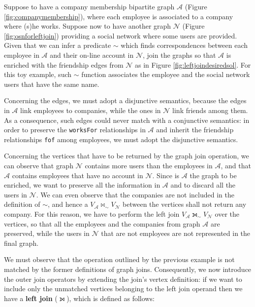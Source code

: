 \begin{example}
	Suppose to have a company membership bipartite graph $\mathcal{A}$ (Figure \ref{fig:companymembership}), where each employee is associated to a company where (s)he works. Suppose now to have another graph $\mathcal{N}$ (Figure \ref{fig:osnforleftjoin}) providing a social network where some users are provided. Given that we can infer a predicate $\sim$ which finds correspondences between each employee in $\mathcal{A}$ and their on-line account in $\mathcal{N}$, join the graphs so that $\mathcal{A}$ is enriched with the friendship edges from $\mathcal{N}$ as in Figure \ref{fig:leftjoindesiredsol}. For this toy example, such $\sim$ function associates the employee and the social network users that have the same name.
	\medskip
	

	Concerning the edges, we must adopt a disjunctive semantics, because the edges in $\mathcal{A}$ link employees to companies, while the ones in $\mathcal{N}$ link friends among them. As a consequence, such edges could never match with a conjunctive semantics: in order to preserve the \texttt{worksFor} relationships in $\mathcal{A}$ and inherit the friendship relationships \texttt{fof} among employees, we must adopt the disjunctive semantics.
	
	Concerning the vertices that have to be returned by the graph join operation, we can observe that graph $\mathcal{N}$ contains more users than the employees in $\mathcal{A}$, and that $\mathcal{A}$ contains employees that have no account in $\mathcal{N}$. Since is $\mathcal{A}$ the graph to be enriched, we want to preserve all the information in $\mathcal{A}$ and to discard all the users in $\mathcal{N}$. We can even observe that the companies are not included in the definition of $\sim$, and hence a $V_{\mathcal{A}}\bowtie_\sim V_{\mathcal{N}}$ between the vertices shall not return any company. For this reason, we have to perform the left join $V_{\mathcal{A}}\leftouterjoin_\sim V_{\mathcal{N}}$ over the vertices, so that all the employees and the companies from graph $\mathcal{A}$ are preserved, while the users in  $\mathcal{N}$ that are not employees are not represented in the final graph. 
\end{example}



We must observe that the operation outlined by the previous example is not matched by the former definitions of graph joins.
Consequently, we now introduce the outer join operators by extending the join's vertex definition: if we want to
include only the unmatched vertices belonging to the left join operand then we have a \textbf{left  join} ($\leftouterjoin$), which is defined as follows:

